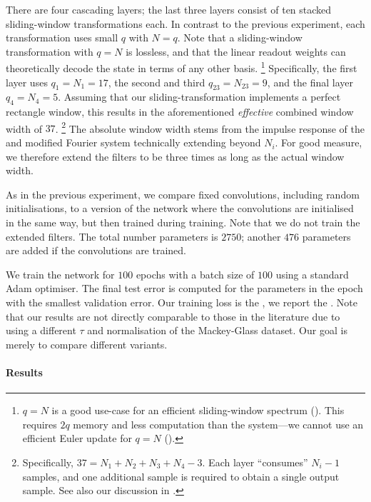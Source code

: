 There are four cascading \LMU layers; the last three layers consist of ten stacked sliding-window transformations each.
In contrast to the previous experiment, each transformation uses small $q$ with $N = q$.
Note that a sliding-window transformation with $q = N$ is lossless, and that the linear readout weights can theoretically decode the state in terms of any other basis.%
\footnote{$q = N$ is a good use-case for an efficient sliding-window spectrum ().
This requires $2q$ memory and less computation than the \LDN system---we cannot use an efficient Euler update for $q = N$ ().}
Specifically, the first \LMU layer uses $q_1 = N_1 = 17$, the second and third $q_{23} = N_{23} = 9$, and the final layer $q_{4} = N_4 = 5$.
Assuming that our sliding-transformation implements a perfect rectangle window, this results in the aforementioned \emph{effective} combined window width of $37$.%
\footnote{Specifically, $37 = N_1 + N_2 + N_3 + N_4 - 3$. Each layer \enquote{consumes} $N_i - 1$ samples, and one additional sample is required to obtain a single output sample. See also our discussion in .}
The absolute window width stems from the impulse response of the \LDN and modified Fourier system technically extending beyond $N_i$.
For good measure, we therefore extend the \FIR filters to be three times as long as the actual window width.

As in the previous experiment, we compare fixed convolutions, including random initialisations, to a version of the network where the convolutions are initialised in the same way, but then trained during training.
Note that we do not train the extended filters.
The total number parameters is $2750$; another $476$ parameters are added if the convolutions are trained.

We train the network for $100$ epochs with a batch size of $100$ using a standard Adam optimiser.
The final test error is computed for the parameters in the epoch with the smallest validation error.
Our training loss is the \MSE, we report the \NRMSE.
Note that our results are not directly comparable to those in the literature due to using a different $\tau$ and normalisation of the Mackey-Glass dataset.
Our goal is merely to compare different \LMU variants.

\paragraph{Results}

